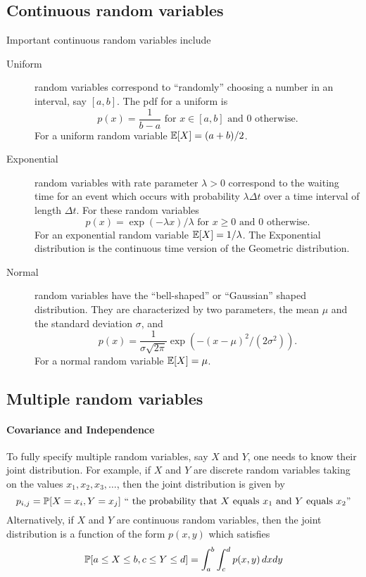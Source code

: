 \subsection*{Continuous random variables}
Important continuous random variables include
\begin{description}
\item[Uniform] random variables correspond to ``randomly'' choosing a number in an interval, say $[a,b]$. The pdf for a uniform is 
\[
p(x)=\frac{1}{b-a} \mbox{ for }x\in[a,b]\mbox{ and } 0 \mbox{ otherwise.}
\]
For a uniform random variable $\E[X]=(a+b)/2$.
\item[Exponential] random variables with rate parameter $\lambda>0$ correspond to the waiting time for an event which occurs with probability $\lambda \Delta t$ over a time interval of length $\Delta t$. For these random variables
\[
p(x)= \exp(-\lambda x)/\lambda \mbox{ for }x\ge 0 \mbox{ and } 0 \mbox{ otherwise.}
\]
For an exponential random variable $\E[X]=1/\lambda$. The Exponential
distribution is the continuous time version of the Geometric
distribution. 

\item[Normal] random variables have the ``bell-shaped'' or ``Gaussian'' shaped distribution. They are characterized by two parameters, the mean $\mu$ and the standard deviation $\sigma$, and
\[
p(x)=\frac{1}{\sigma\sqrt{2\pi}}\exp(-(x-\mu)^2/(2\sigma^2)).
\]
For a normal random variable $\E[X]=\mu$. 
\end{description}

\subsection*{Multiple random variables}

\paragraph{Covariance and Independence} To fully specify multiple random variables, say $X$ and $Y$, one needs to know their joint distribution. For example, if $X$ and $Y$ are discrete random variables taking on the values $x_1,x_2,x_3,\dots$, then the joint distribution is given by 
\[
p_{i,j}=\P[X=x_i,Y=x_j] \mbox{ `` the probability that $X$ equals $x_1$ and $Y$ equals $x_2$''}
\]
Alternatively, if $X$ and $Y$ are continuous random variables, then the joint distribution is a function of the form $p(x,y)$ which satisfies 
\[
\P[a\le X\le b, c\le Y\le d]= \int_a^b \int_c^d p(x,y)\,dxdy
\]

